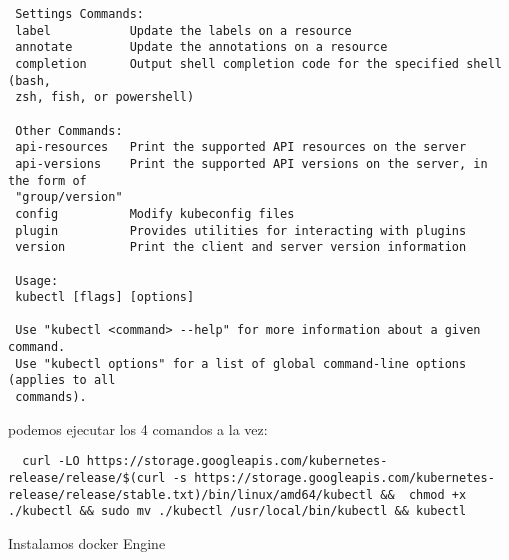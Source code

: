 \documentclass[../main.tex]{subfiles}
\begin{document}
\begin{lstlisting}
 Settings Commands:
 label           Update the labels on a resource
 annotate        Update the annotations on a resource
 completion      Output shell completion code for the specified shell (bash,
 zsh, fish, or powershell)
 
 Other Commands:
 api-resources   Print the supported API resources on the server
 api-versions    Print the supported API versions on the server, in the form of
 "group/version"
 config          Modify kubeconfig files
 plugin          Provides utilities for interacting with plugins
 version         Print the client and server version information
 
 Usage:
 kubectl [flags] [options]
 
 Use "kubectl <command> --help" for more information about a given command.
 Use "kubectl options" for a list of global command-line options (applies to all
 commands).
 \end{lstlisting}
 
 podemos ejecutar los 4 comandos a la vez:
\begin{lstlisting} 
  curl -LO https://storage.googleapis.com/kubernetes-release/release/$(curl -s https://storage.googleapis.com/kubernetes-release/release/stable.txt)/bin/linux/amd64/kubectl &&  chmod +x ./kubectl && sudo mv ./kubectl /usr/local/bin/kubectl && kubectl
\end{lstlisting} 
Instalamos docker Engine

\begin{lstlisting}

\end{lstlisting}

\begin{lstlisting} 
\end{lstlisting}

\begin{lstlisting} 
\end{lstlisting}

\begin{lstlisting} 
\end{lstlisting}

\begin{lstlisting} 
\end{lstlisting}
\end{document}

